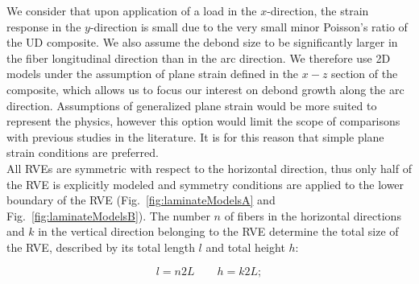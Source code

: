 \documentclass[smallextended]{svjour3}       %
\begin{document}
We consider that upon application of a load in the $x$-direction, the strain response in the $y$-direction is small due to the very small minor Poisson's ratio of the UD composite. We also assume the debond size to be significantly larger in the fiber longitudinal direction than in the arc direction. We therefore use 2D models under the assumption of plane strain defined in the $x-z$ section of the composite, which allows us to focus our interest on debond growth along the arc direction. Assumptions of generalized plane strain would be more suited to represent the physics, however this option would limit the scope of comparisons with previous studies in the literature. It is for this reason that simple plane strain conditions are preferred.\\
All RVEs are symmetric with respect to the horizontal direction, thus only half of the RVE is explicitly modeled and symmetry conditions are applied to the lower boundary of the RVE (Fig.~\ref{fig:laminateModelsA} and Fig.~\ref{fig:laminateModelsB}). The number $n$ of fibers in the horizontal directions and $k$ in the vertical direction belonging to the RVE determine the total size of the RVE, described by its total length $l$ and total height $h$:

\begin{equation}\label{eq:lengthheight}
l=n2L\qquad h=k2L;
\end{equation}
\end{document}
